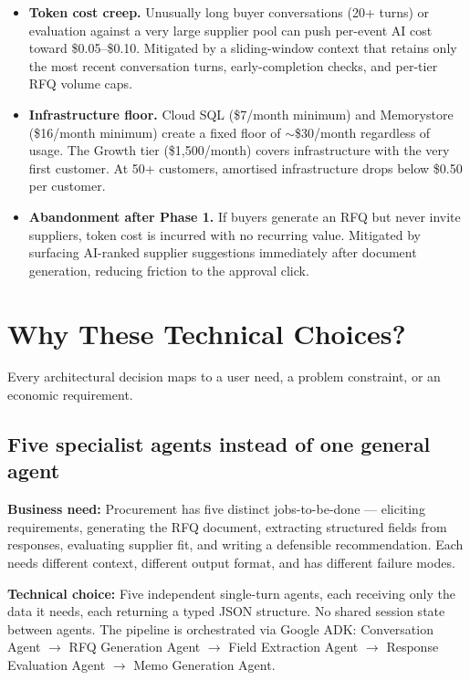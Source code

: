 \documentclass[11pt, a4paper]{article}
\begin{document}
\begin{itemize}
  \item \textbf{Token cost creep.} Unusually long buyer conversations (20+ turns)
    or evaluation against a very large supplier pool can push per-event AI cost
    toward \$0.05--\$0.10. Mitigated by a sliding-window context that retains only
    the most recent conversation turns, early-completion checks, and per-tier
    RFQ volume caps.

  \item \textbf{Infrastructure floor.} Cloud SQL (\$7/month minimum) and
    Memorystore (\$16/month minimum) create a fixed floor of $\sim$\$30/month
    regardless of usage. The Growth tier (\$1,500/month) covers infrastructure
    with the very first customer. At 50+ customers, amortised infrastructure
    drops below \$0.50 per customer.

  \item \textbf{Abandonment after Phase 1.} If buyers generate an RFQ but never
    invite suppliers, token cost is incurred with no recurring value. Mitigated
    by surfacing AI-ranked supplier suggestions immediately after document
    generation, reducing friction to the approval click.
\end{itemize}

\section{Why These Technical Choices?}

Every architectural decision maps to a user need, a problem constraint, or an
economic requirement.

\subsection{Five specialist agents instead of one general agent}

\textbf{Business need:} Procurement has five distinct jobs-to-be-done ---
eliciting requirements, generating the RFQ document, extracting structured fields
from responses, evaluating supplier fit, and writing a defensible recommendation.
Each needs different context, different output format, and has different failure modes.

\textbf{Technical choice:} Five independent single-turn agents, each receiving
only the data it needs, each returning a typed JSON structure.
No shared session state between agents. The pipeline is orchestrated via Google ADK:
Conversation Agent $\to$ RFQ Generation Agent $\to$ Field Extraction Agent $\to$
Response Evaluation Agent $\to$ Memo Generation Agent.
\end{document}
